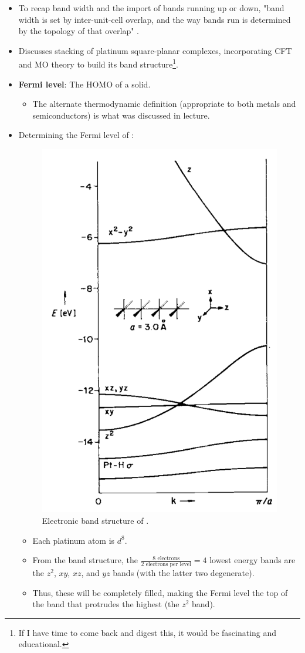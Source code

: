 \documentclass[../notes.tex]{subfiles}
\begin{document}
\begin{itemize}
\begin{itemize}
    \end{itemize}
    \item To recap band width and the import of bands running up or down, "band width is set by inter-unit-cell overlap, and the way bands run is determined by the topology of that overlap" \parencite[849]{bib:bandTheory}.
    \item Discusses stacking of platinum square-planar complexes, incorporating CFT and MO theory to build its band structure\footnote{If I have time to come back and digest this, it would be fascinating and educational.}.
    \item \textbf{Fermi level}: The HOMO of a solid.
    \begin{itemize}
        \item The alternate thermodynamic definition (appropriate to both metals and semiconductors) is what was discussed in lecture.
    \end{itemize}
    \item Determining the Fermi level of :
    \begin{figure}[H]
        \centering
        \includegraphics[width=0.3\linewidth]{../ExtFiles/bandStructure-PtH4.png}
        \caption{Electronic band structure of .}
        \label{fig:bandStructure-PtH4}
    \end{figure}
    \begin{itemize}
        \item Each platinum atom is $d^8$.
        \item From the band structure, the $\frac{8\text{ electrons}}{2\text{ electrons per level}}=4$ lowest energy bands are the $z^2$, $xy$, $xz$, and $yz$ bands (with the latter two degenerate).
        \item Thus, these will be completely filled, making the Fermi level the top of the band that protrudes the highest (the $z^2$ band).
    \end{itemize}

\end{itemize}
\end{document}
